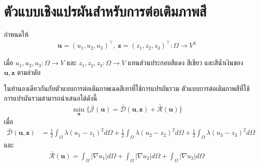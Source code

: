 \section{ตัวแบบเชิงแปรผันสำหรับการต่อเติมภาพสี}\label{inpaint-model-color}

\hspace{1cm} กำหนดให้	
\begin{align*}
	\boldsymbol{u} = (u_1,u_2,u_3)^{\top},\ \boldsymbol{z} = (z_1,z_2,z_3)^{\top} : \Omega  \rightarrow V^3
\end{align*}
	
\noindent เมื่อ $u_1,u_2,u_3: \Omega  \rightarrow V$ และ $z_1,z_2,z_3: \Omega  \rightarrow V$ แทนส่วนประกอบสีแดง สีเขียว และสีน้ำเงินของ $\boldsymbol{u},\boldsymbol{z}$ ตามลำดับ 
	
\hspace{1cm} ในทำนองเดียวกันกับตัวแบบการต่อเติมภาพเฉดสีเทาที่ใช้การแปรผันรวม ตัวแบบการต่อเติมภาพสีที่ใช้การแปรผันรวมสามารถนำเสนอได้ดังนี้
\begin{align}
	\min_{\boldsymbol{u}} \{ \bar{\mathcal{J}}(\boldsymbol{u})= \mathcal{\bar{D}}(\boldsymbol{u},\boldsymbol{z})+  \mathcal{\bar{R}}(\boldsymbol{u}) \}
	\label{e10}
\end{align}
เมื่อ
\begin{align*}
	\mathcal{\bar{D}}(\boldsymbol{u},\boldsymbol{z}) 
	&= \frac{1}{2}\int_{\Omega}^{}\lambda(u_1 - z_1)^2 d\Omega + \frac{1}{2}\int_{\Omega}^{}\lambda(u_2 - z_2)^2 d\Omega + \frac{1}{2}\int_{\Omega}^{}\lambda(u_3 - z_3)^2 d\Omega
\end{align*}
และ 
\begin{align*}
	\mathcal{\bar{R}}(\boldsymbol{u})= \int_{\Omega}^{}\lvert\nabla u_1 \rvert d\Omega + \int_{\Omega}^{}\lvert\nabla u_2 \rvert d\Omega + \int_{\Omega}^{}\lvert\nabla u_3 \rvert d\Omega
\end{align*}